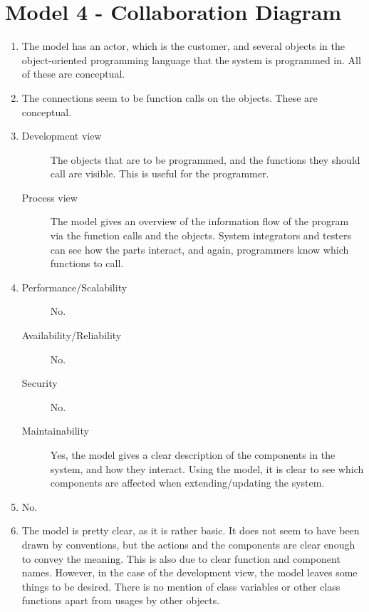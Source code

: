\section{Model 4 - Collaboration Diagram}
\begin{enumerate}
	\item The model has an actor, which is the customer, and several objects in the object-oriented programming language that the system is programmed in.
	All of these are conceptual.
	
	\item The connections seem to be function calls on the objects. These are conceptual.
	
	\item
	\begin{description}
		\item[Development view] The objects that are to be programmed, and the functions they should call are visible. This is useful for the programmer.
		\item[Process view] The model gives an overview of the information flow of the program via the function calls and the objects. 
		System integrators and testers can see how the parts interact, and again, programmers know which functions to call.
	\end{description}
	
	\item
	\begin{description}
		\item[Performance/Scalability] No.
		\item[Availability/Reliability] No.
		\item[Security] No.
		\item[Maintainability] Yes, the model gives a clear description of the components in the system, and how they interact. 
		Using the model, it is clear to see which components are affected when extending/updating the system.
	\end{description}
	
	\item No.
	
	\item The model is pretty clear, as it is rather basic.
	It does not seem to have been drawn by conventions, but the actions and the components are clear enough to convey the meaning.
	This is also due to clear function and component names.
	However, in the case of the development view, the model leaves some things to be desired.
	There is no mention of class variables or other class functions apart from usages by other objects.
\end{enumerate}
